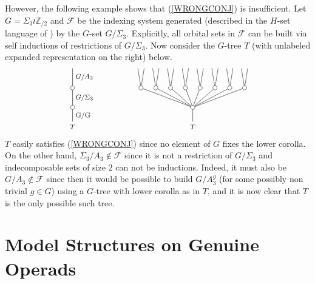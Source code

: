 \documentclass[a4paper,10pt]{article}%
\begin{document}
\begin{remark}
However, the following example shows that  
(\ref{WRONGCONJ}) 
is insufficient. Let $G = \Sigma_3 \wr \mathbb{Z}_{/2}$
and $\mathcal{F}$ be the indexing system generated
(described in the $H$-set language of \cite{BH15}) by the $G$-set $G/\Sigma_3$.
Explicitly, all orbital sets in $\mathcal{F}$ can be built via self inductions of restrictions of $G/\Sigma_3$.
Now consider the $G$-tree $T$ (with unlabeled expanded representation on the right) below.
\begin{equation}
\begin{tikzpicture}
[grow=up,auto,level distance=2.3em,every node/.style = {font=\footnotesize},dummy/.style={circle,draw,inner sep=0pt,minimum size=1.75mm}]
	\tikzstyle{level 2}=[sibling distance = 1.75em]
	\tikzstyle{level 3}=[sibling distance = 0.75em]
	\node at (0,0) {$T$}
		child{node [dummy] {}
			child{node [dummy] {}
				child{
				edge from parent node [swap] {$G/A_3$} }
			edge from parent node [swap] {$G/\Sigma_3$} }
		edge from parent node [swap] {G/G}
		};
	\node at (5,0) {$T$}
		child{node [dummy] {}
			child{node [dummy] {}
				child
				child
			}
			child{node [dummy] {}
				child
				child
			}
			child{node [dummy] {}
				child
				child
			}
			child{node [dummy] {}
				child
				child
			}
			child{node [dummy] {}
				child
				child
			}
			child{node [dummy] {}
				child
				child
			}
			child{node [dummy] {}
				child
				child
			}
			child{node [dummy] {}
				child
				child
			}
		};
\end{tikzpicture}
\end{equation}
$T$ easily satisfies (\ref{WRONGCONJ}) since no element of $G$ fixes the lower corolla. On the other hand, $\Sigma_3/A_3 \nin \mathcal{F}$ since it is not a restriction of $G/\Sigma_3$ and indecomposable sets of size $2$ can not be inductions. Indeed, it must also be $G/A_3 \nin \mathcal{F}$
since then it would be possible to build $G/A_3^g$ (for some possibly non trivial $g \in G$) using a $G$-tree with lower corolla as in $T$, and it is now clear that $T$ is the only possible such tree.
\end{remark}







\newpage


\section{Model Structures on Genuine Operads}
\renewcommand{\F}{\ensuremath{\mathcal F}}
\end{document}
